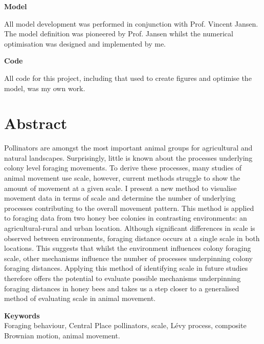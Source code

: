 \documentclass[11pt,usenames,dvipsnames,a4paper]{article}
\begin{document}
\noindent
\Large{\textbf{Model}}

\noindent
All model development was performed in conjunction with Prof. Vincent Jansen. The model definition was pioneered by Prof. Jansen whilst the numerical optimisation was designed and implemented by me.

\noindent
\Large{\textbf{Code}}

\noindent
All code for this project, including that used to create figures and optimise the model, was my own work.

\newpage
\tableofcontents
\newpage

\section{Abstract}

\begin{linenumbers}
Pollinators are amongst the most important animal groups for agricultural and natural landscapes. Surprisingly, little is known about the processes underlying colony level foraging movements. To derive these processes, many studies of animal movement use scale, however, current methods struggle to show the amount of movement at a given scale. I present a new method to visualise movement data in terms of scale and determine the number of underlying processes contributing to the overall movement pattern. This method is applied to foraging data from two honey bee colonies in contrasting environments: an agricultural-rural and urban location. Although significant differences in scale is observed between environments, foraging distance occurs at a single scale in both locations. This suggests that whilst the environment influences colony foraging scale, other mechanisms influence the number of processes underpinning colony foraging distances. Applying this method of identifying scale in future studies therefore offers the potential to evaluate possible mechanisms underpinning foraging distances in honey bees and takes us a step closer to a generalised method of evaluating scale in animal movement.	
\end{linenumbers}

\noindent
\Large{\textbf{Keywords}}\\
\noindent
Foraging behaviour, Central Place pollinators, scale, L\'evy process, composite Brownian motion, animal movement.
\end{document}
